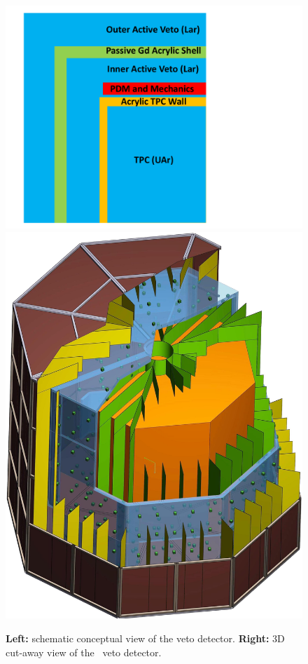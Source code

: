 \begin{figure}[!t]
\includegraphics[height=0.43\textheight]{./Figures/Veto.pdf}
\includegraphics[height=0.43\textheight]{./Figures/Veto-CutAway.jpg}
\caption[Schematic and 3D cut-away view of the \DSks\ veto detector]{{\bf Left:} schematic conceptual view of the veto detector.  {\bf Right:} 3D cut-away view of the \DSks\ veto detector.}
\label{fig:VetoScheme}
\end{figure}

